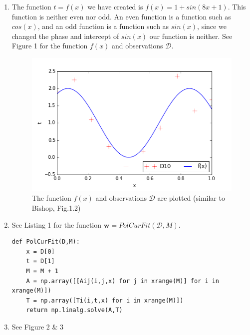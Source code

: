 \documentclass[a4paper,11pt]{article}
\theoremstyle{mytheor}
\begin{document}
\begin{enumerate}
	\item The function $t = f(x)$ we have created is $f(x) = 1 + sin(8x+1)$. This function is neither even nor odd. An even function is a function such as $cos(x)$, and an odd function is a function such as $sin(x)$, since we changed the phase and intercept of $sin(x)$ our function is neither. See Figure 1 for the function $f(x)$ and observations $\mathcal{D}$. \vspace{-0.2cm}
		\begin{figure}[h]
			\centering
			\includegraphics[scale=0.8]{1_1.png}\vspace{-0.5cm}
			\caption{\vspace{-0.2cm}The function $f(x)$ and observations $\mathcal{D}$ are plotted (similar to Bishop, Fig.1.2)}
		\end{figure}
	\item See Listing 1 for the function $\boldsymbol{w} = PolCurFit(\mathcal{D},M)$.\vspace{-0.5cm}
		\begin{lstlisting}[label={list:first},caption=Python code for function PolCurFit -- Input are the observations $\mathcal{D}$ and the results $t$ of function $f(x)$ and the order of the polynomial $M$. The functions calculates the $A$-matrix and $T$-vector and solves this equation to find the weights.]
def PolCurFit(D,M):
    x = D[0]
    t = D[1]
    M = M + 1
    A = np.array([[Aij(i,j,x) for j in xrange(M)] for i in xrange(M)])
    T = np.array([Ti(i,t,x) for i in xrange(M)])
    return np.linalg.solve(A,T)
		\end{lstlisting}
	\item See Figure 2 \& 3 \vspace{-0.2cm}
		\begin{figure}[h]

\end{figure}
\end{enumerate}
\end{document}
